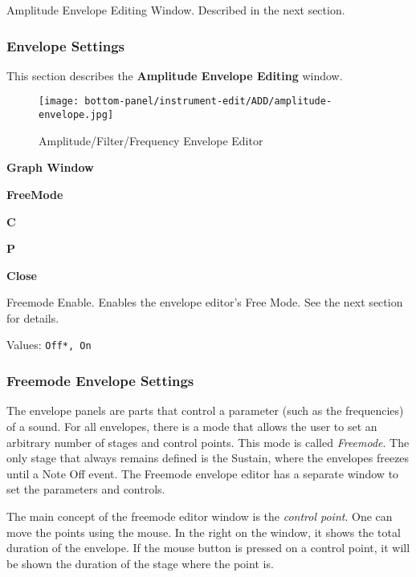    Amplitude Envelope Editing Window.
   Described in the next section.

\subsubsection{Envelope Settings}
\label{subsubsec:envelope_settings}

   This section describes the \textbf{Amplitude Envelope Editing} window.

\begin{figure}[H]
   \centering 
   \texttt{[image: bottom-panel/instrument-edit/ADD/amplitude-envelope.jpg]}
   \caption{Amplitude/Filter/Frequency Envelope Editor}
   \label{fig:amplitude_envelope_editor}
\end{figure}

   \begin{enumber}
      \item \textbf{Graph Window}
      \item \textbf{FreeMode}
      \item \textbf{C}
      \item \textbf{P}
      \item \textbf{Close}
   \end{enumber}

   \setcounter{ItemCounter}{0}      %

   Freemode Enable.
   Enables the envelope editor's Free Mode.
   See the next section for details.

   Values: \texttt{Off*, On} \\

\subsubsection{Freemode Envelope Settings}
\label{subsubsec:freemode_envelope_settings}

   The envelope panels are parts that control a parameter (such as the
   frequencies) of a sound.  For all envelopes, there is a mode that allows the
   user to set an arbitrary number of stages and control points. This mode is
   called \textsl{Freemode}.  The only stage that always remains defined is the
   Sustain, where the envelopes freezes until a Note Off event.  The Freemode
   envelope editor has a separate window to set the parameters and controls.

   The main concept of the freemode editor window is the
   \textsl{control point}.
   One can move the points using the mouse. In the right on the
   window, it shows the total duration of the envelope. If the mouse button
   is pressed on a control point, it will be shown the duration of the
   stage where the point is.

